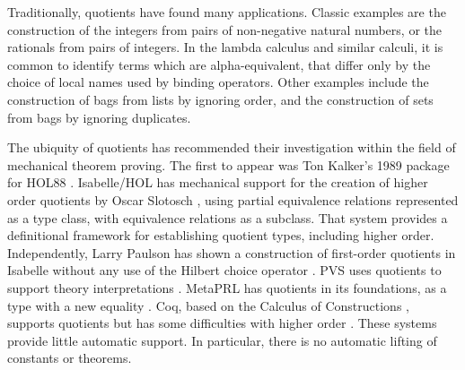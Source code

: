 \documentclass[envcountsame,runningheads]{llncs}
\begin{document}
Traditionally, quotients have found many applications. 
Classic examples are the construction
of the integers from pairs of non-negative natural numbers,
or
the rationals from pairs of integers. 
In the lambda calculus \cite{Bar81} and similar calculi, it is
common to identify terms which are alpha-equivalent, that differ only by
the choice of local names used by binding operators.
Other examples include the construction of bags from lists by ignoring order,
and the construction of sets from bags by ignoring duplicates.

The ubiquity of quotients has recommended their investigation
within the field of mechanical theorem proving.
The first to appear was Ton Kalker's 1989 package for HOL88 \cite{Kal89}.
Isabelle/HOL
\cite{NiPaWe02}
has mechanical support for the creation of
higher order quotients by Oscar Slotosch \cite{Slo97},
using partial equivalence relations represented as a type class,
with equivalence relations as a subclass.
That system provides a definitional framework for establishing
quotient types, including higher order.
Independently, Larry Paulson has shown a construction of first-order quotients
in Isabelle without any use of the Hilbert choice operator
\cite{LP04}.
PVS uses quotients to support theory interpretations \cite{OwS01}.
MetaPRL has quotients in its foundations,
as a type with a new equality \cite{Nog02}.
Coq, based on the Calculus of Constructions \cite{Hof95},
supports quotients \cite{GPWZ02} but
has some difficulties with higher order
\cite{CPS02}.
These systems provide little automatic support.
In particular, there is no automatic lifting of constants or theorems.
\end{document}
